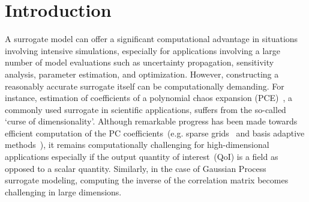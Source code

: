 \section{Introduction}
\label{sec:intro}



A surrogate model can offer a significant computational advantage in situations involving intensive
simulations, especially for applications
involving a large number of model evaluations such as uncertainty propagation, sensitivity analysis, parameter
estimation, and optimization. However, constructing a reasonably accurate surrogate itself can be computationally demanding.
For instance, estimation of coefficients of a polynomial chaos expansion (PCE)~\cite{Xiu:2002,Ghanem:1991},
a commonly used surrogate
in scientific applications, suffers from the so-called `curse of dimensionality'. Although remarkable progress has been 
made towards efficient computation of the PC coefficients~(e.g. sparse 
grids~\cite{Gerstner:1998,Ganapathysubramanian:2007} and basis adaptive 
methods~\cite{Blatman:2011,Conrad:2013,Winokur:2013}), it remains computationally challenging for high-dimensional 
applications especially if the output quantity of interest~(QoI) is a field as opposed 
to a scalar quantity. Similarly, in the case of Gaussian 
Process~\cite{Rasmussen:2004} surrogate modeling, computing the inverse of the correlation matrix
becomes challenging in large dimensions. 

